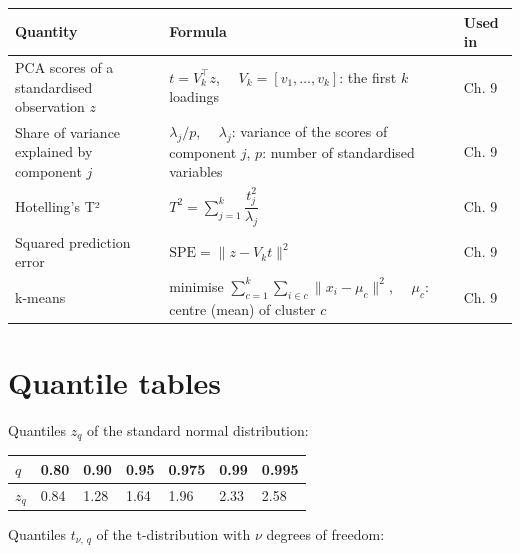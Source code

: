 \documentclass[
  letterpaper,
  DIV=11,
  numbers=noendperiod]{scrreprt}
\begin{document}
\begin{longtable}[]{@{}
  >{\raggedright\arraybackslash}p{}
  >{\raggedright\arraybackslash}p{}
  >{\raggedright\arraybackslash}p{}@{}}
\toprule\noalign{}
\begin{minipage}[b]{\linewidth}\raggedright
Quantity
\end{minipage} & \begin{minipage}[b]{\linewidth}\raggedright
Formula
\end{minipage} & \begin{minipage}[b]{\linewidth}\raggedright
Used in
\end{minipage} \\
\midrule\noalign{}
\endhead
\bottomrule\noalign{}
\endlastfoot
PCA scores of a standardised observation \(z\) & \(t = V_k^\top z\),
\(\quad V_k = [v_1, \dots, v_k]\): the first \(k\) loadings & Ch. 9 \\
Share of variance explained by component \(j\) & \(\lambda_j / p\),
\(\quad \lambda_j\): variance of the scores of component \(j\), \(p\):
number of standardised variables & Ch. 9 \\
Hotelling's T² & \(T^2 = \sum_{j=1}^k \dfrac{t_j^2}{\lambda_j}\) & Ch.
9 \\
Squared prediction error & \(\text{SPE} = \lVert z - V_k t \rVert^2\) &
Ch. 9 \\
k-means & minimise
\(\sum_{c=1}^{k} \sum_{i \in c} \lVert x_i - \mu_c \rVert^2\),
\(\quad \mu_c\): centre (mean) of cluster \(c\) & Ch. 9 \\
\end{longtable}

\section{Quantile tables}\label{quantile-tables}

Quantiles \(z_q\) of the standard normal distribution:

\begin{longtable}[]{@{}lllllll@{}}
\toprule\noalign{}
\(q\) & 0.80 & 0.90 & 0.95 & 0.975 & 0.99 & 0.995 \\
\midrule\noalign{}
\endhead
\bottomrule\noalign{}
\endlastfoot
\(z_q\) & 0.84 & 1.28 & 1.64 & 1.96 & 2.33 & 2.58 \\
\end{longtable}

Quantiles \(t_{\nu,\,q}\) of the t-distribution with \(\nu\) degrees of
freedom:
\end{document}
